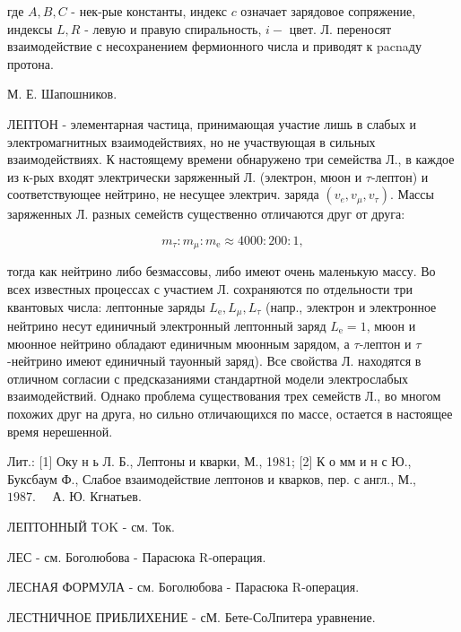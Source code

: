 \documentclass[10pt]{article}
\begin{document}
где $A, B, C$ - нек-рые константы, индекс $c$ означает зарядовое сопряжение, индексы $L, R$ - левую и правую спиральность, $i-$ цвет. Л. переносят взаимодействие с несохранением фермионного числа и приводят к pacnaду протона.



М. Е. Шапошников.



ЛЕПТОН - элементарная частица, принимающая участие лишь в слабых и электромагнитных взаимодействиях, но не участвующая в сильных взаимодействиях. К настоящему времени обнаружено три семейства Л., в каждое из к-рых входят электрически заряженный Л. (электрон, мюон и $\tau$-лептон) и соответствующее нейтрино, не несущее электрич. заряда $\left(v_{e}, v_{\mu}, v_{\tau}\right)$. Массы заряженных Л. разных семейств существенно отличаются друг от друга:



\[

m_{\tau}: m_{\mu}: m_{\mathrm{e}} \approx 4000: 200: 1,

\]



тогда как нейтрино либо безмассовы, либо имеют очень маленькую массу. Во всех известных процессах с участием Л. сохраняются по отдельности три квантовых числа: лептонные заряды $L_{\mathrm{e}}, L_{\mu}, L_{\tau}$ (напр., электрон и электронное нейтрино несут единичный электронный лептонный заряд $L_{\mathrm{e}}=1$, мюон и мюонное нейтрино обладают единичным мюонным зарядом, а $\tau$-лептон и $\tau$-нейтрино имеют единичный тауонный заряд). Все свойства Л. находятся в отличном согласии с предсказаниями стандартной модели электрослабых взаимодействий. Однако проблема существования трех семейств Л., во многом похожих друг на друга, но сильно отличающихся по массе, остается в настоящее время нерешенной.



Лит.: [1] Оку н ь Л. Б., Лептоны и кварки, М., 1981; [2] К о мм и н с Ю., Буксбаум Ф., Слабое взаимодействие лептонов и кварков, пер. с англ., М., $1987 . \quad$ А. Ю. Кгнатьев.



ЛЕПТОННЫЙ ТOK - см. Ток.



ЛЕС - см. Боголюбова - Парасюка R-операция.



ЛЕСНАЯ ФОРМУЛА - см. Боголюбова - Парасюка R-операция.



ЛЕСТНИЧНОЕ ПРИБЛИХЕНИЕ - сМ. Бете-СоЛпитера уравнение.
\end{document}
